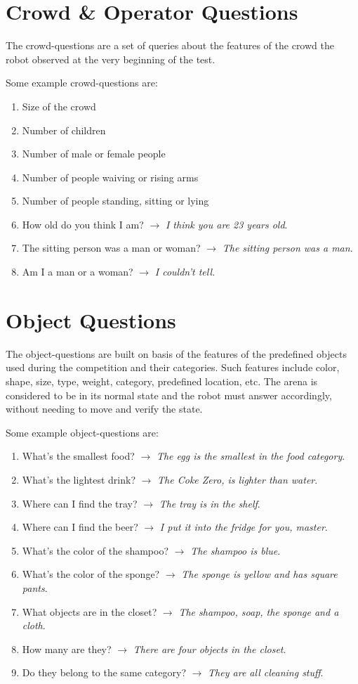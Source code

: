 \section{Crowd \& Operator Questions}
The crowd-questions are a set of queries about the features of the crowd the robot observed at the very beginning of the test.

Some example crowd-questions are:
\begin{enumerate}
    \item Size of the crowd
    \item Number of children
    \item Number of male or female people
    \item Number of people waiving or rising arms
    \item Number of people standing, sitting or lying
    \item How old do you think I am? $\rightarrow$ \textit{I think you are 23 years old}.
    \item The sitting person was a man or woman? $\rightarrow$ \textit{The sitting person was a man}.
    \item Am I a man or a woman? $\rightarrow$ \textit{I couldn't tell.}
\end{enumerate}

\section{Object Questions}
The object-questions are built on basis of the features of the predefined objects used during the competition and their categories. Such features include color, shape, size, type, weight, category, predefined location, etc. The arena is considered to be in its normal state and the robot must answer accordingly, without needing to move and verify the state.

Some example object-questions are:
\begin{enumerate}
    \item What's the smallest food? $\rightarrow$ \textit{The egg is the smallest in the food category}.
    \item What's the lightest drink? $\rightarrow$ \textit{The Coke Zero, is lighter than water}.
    \item Where can I find the tray? $\rightarrow$ \textit{The tray is in the shelf}.
    \item Where can I find the beer? $\rightarrow$ \textit{I put it into the fridge for you, master}.
    \item What's the color of the shampoo? $\rightarrow$ \textit{The shampoo is blue}.
    \item What's the color of the sponge? $\rightarrow$ \textit{The sponge is yellow and has square pants}.
    \item What objects are in the closet? $\rightarrow$ \textit{The shampoo, soap, the sponge and a cloth}.
    \item How many are they? $\rightarrow$ \textit{There are four objects in the closet}.
    \item Do they belong to the same category? $\rightarrow$ \textit{They are all cleaning stuff}.
\end{enumerate}

